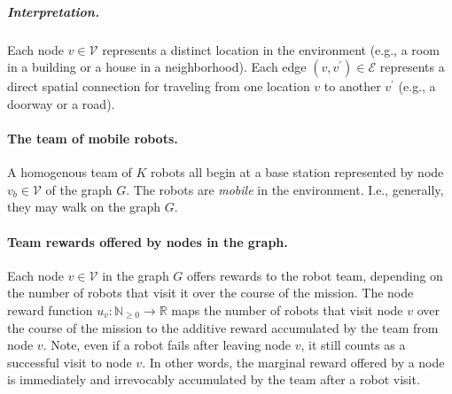 \documentclass[11pt, oneside]{article}
\begin{document}
\vspace{-\baselineskip}
\subparagraph{Interpretation.} 
Each node $v\in \mathcal{V}$ represents a distinct location in the environment (e.g., a room in a building or a house in a neighborhood).
Each edge $(v, v^\prime) \in \mathcal{E}$ represents a direct spatial connection for traveling from one location $v$ to another $v^\prime$ (e.g., a doorway or a road).



\paragraph{The team of mobile robots.}
A homogenous team of $K$ robots all begin at a base station represented by node $v_b \in \mathcal{V}$ of the graph $G$. The robots are \emph{mobile} in the environment. I.e., generally, they may walk on the graph $G$.

\paragraph{Team rewards offered by nodes in the graph.}
Each node $v\in \mathcal{V}$ in the graph $G$ offers rewards to the robot team, depending on the number of robots that visit it over the course of the mission. 
The node reward function $u_v: \mathbb{N}_{\geq 0} \rightarrow \mathbb{R}$ maps 
the number of robots that visit node $v$ over the course of the mission
 to 
 the additive reward accumulated by the team from node $v$.
Note, even if a robot fails after leaving node $v$, it still counts as a successful visit to node $v$.
In other words, the marginal reward offered by a node is immediately and irrevocably accumulated by the team after a robot visit.
\end{document}
